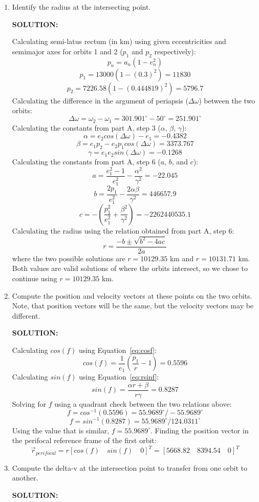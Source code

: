 \documentclass[12pt, letterpaper]{aiaa-tc}
\begin{document}
\begin{enumerate}
    \item Identify the radius at the intersecting point.
    
    \textbf{SOLUTION:}

    Calculating semi-latus rectum (in km) using given eccentricities and semimajor axes for orbits 1 and 2 ($p_1$ and $p_2$ respectively):
    \[ p_n=a_n\left(1-e_n^2\right) \]
    \[ p_1=13000\left(1-(0.3)^2\right)=11830 \]
    \[ p_2=7226.58\left(1-(0.444819)^2\right)=5796.7 \]
    Calculating the difference in the argument of periapsis ($\Delta\omega$) between the two orbits:
    \[ \Delta\omega=\omega_2-\omega_1=301.901^{\circ} -50^{\circ}=251.901^{\circ} \]
    Calculating the constants from part A, step 3 ($\alpha$, $\beta$, $\gamma$):
    \[ \alpha=e_2cos(\Delta\omega)-e_1=-0.4382 \]
    \[ \beta=e_1p_2-e_2p_1cos(\Delta\omega)=3373.767 \]
    \[ \gamma=e_1e_2sin(\Delta\omega)=-0.1268 \]
    Calculating the constants from part A, step 6 ($a$, $b$, and $c$):
    \[ a=\frac{e_1^2-1}{e_1^2}-\frac{\alpha^2}{\gamma^2}=-22.045 \]
    \[ b=\frac{2p_1}{e_1^2}-\frac{2\alpha\beta}{\gamma^2}=446657.9 \]
    \[ c=-\left(\frac{p_1^2}{e_1^2}+\frac{\beta^2}{\gamma^2}\right)=-2262440535.1 \]
    Calculating the radius using the relation obtained from part A, step 6:
    \[ r=\frac{-b\pm\sqrt{b^2-4ac}}{2a} \]
    where the two possible solutions are $r=10129.35$ km and $r=10131.71$ km. 
    Both values are valid solutions of where the orbits intersect, so we chose to continue
    using $r=10129.35$ km.

    \item Compute the position and velocity vectors at these points on the two orbits. Note, that position vectors will
    be the same, but the velocity vectors may be different.
    
    \textbf{SOLUTION:}
    
    Calculating $cos(f)$ using Equation~\eqref{eq:cosf}:
    \[ cos(f)=\frac{1}{e_1}\left (\frac{p_1}{r}-1 \right)=0.5596 \]
    Calculating $sin(f)$ using Equation~\eqref{eq:rsinf}:
    \[ sin(f)=\frac{\alpha r+\beta}{r\gamma}=0.8287 \]
    Solving for $f$ using a quadrant check between the two relations above:
    \[ f=cos^{-1}(0.5596)=55.9689^{\circ}/-55.9689^{\circ} \]
    \[ f=sin^{-1}(0.8287)=55.9689^{\circ}/124.0311^{\circ} \]
    Using the value that is similar, $f=55.9689^{\circ}$.
    Finding the position vector in the perifocal reference frame of the first orbit:
    \[ \vec{r}_{perifocal}=r[cos(f)\quad sin(f)\quad 0]^T=[5668.82\quad 8394.54\quad 0]^T \]




    \item Compute the delta-v at the intersection point to transfer from one orbit to another.
    
    \textbf{SOLUTION:}

\end{enumerate}
\end{document}
